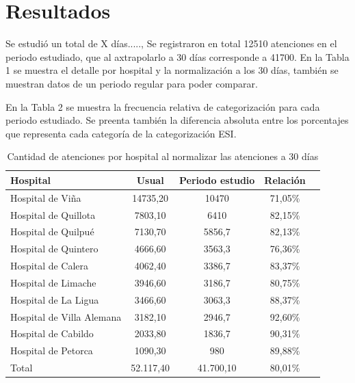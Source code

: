 \documentclass{article}
\begin{document}
\section{Resultados}

Se estudió un total de X días....., Se registraron en total 12510 atenciones en el periodo estudiado, que al axtrapolarlo a 30 días corresponde a 41700. En la Tabla 1 se muestra el detalle por hospital y la normalización a los 30 días, también se muestran datos de un periodo regular para poder comparar.

En la Tabla 2 se muestra la frecuencia relativa de categorización para cada periodo estudiado. Se preenta también la diferencia absoluta entre los porcentajes que representa cada categoría de la categorización ESI.


\begin{table}[H]
\centering
\begin{tabular}{@{}lcccc@{}}
\toprule
\textbf{Hospital}         & \textbf{Usual} & \textbf{Periodo estudio} & \textbf{Relación} \\ \midrule
Hospital de Viña          & 14735,20       & 10470                    & 71,05\%           \\
Hospital de Quillota      & 7803,10        & 6410                     & 82,15\%           \\
Hospital de Quilpué       & 7130,70        & 5856,7                   & 82,13\%           \\
Hospital de Quintero      & 4666,60        & 3563,3                   & 76,36\%           \\
Hospital de Calera        & 4062,40        & 3386,7                   & 83,37\%           \\
Hospital de Limache       & 3946,60        & 3186,7                   & 80,75\%           \\
Hospital de La Ligua      & 3466,60        & 3063,3                   & 88,37\%           \\
Hospital de Villa Alemana & 3182,10        & 2946,7                   & 92,60\%           \\
Hospital de Cabildo       & 2033,80        & 1836,7                   & 90,31\%           \\
Hospital de Petorca       & 1090,30        & 980                      & 89,88\%           \\ 
Total                     & 52.117,40      & 41.700,10                & 80,01\%           \\ \bottomrule
\end{tabular}
\caption{Cantidad de atenciones por hospital al normalizar las atenciones a 30 días}
\end{table}
\end{document}
